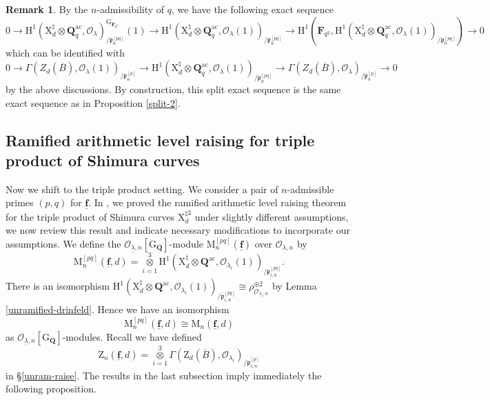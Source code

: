 \documentclass[10pt]{amsart}
\numberwithin{equation}{section}
\theoremstyle{plain}
\numberwithin{equation}{section}
\theoremstyle{definition}
\newtheorem{remark}[equation]{Remark}
\theoremstyle{remark}
\def\ac{\mathrm{ac}}
\def\ac{\mathrm{ac}}
\def\undlamb{\underline{\lambda}}
\def\triplef{\underline{\mathbf{f}}}
\def\threetensor{\overset{3}{\underset{i=1}\otimes}}
\def\calO{\mathcal{O}}
\def\frakp{\mathfrak{p}}
\def\FF{\mathbf{F}}
\def\QQ{\mathbf{Q}}
\def\rmG{\mathrm{G}}
\def\rmH{\mathrm{H}}
\def\rmM{\mathrm{M}}
\def\rmX{\mathrm{X}}
\def\rmZ{\mathrm{Z}}
\begin{document}
\begin{remark}
By the $n$-admissibility of $q$, we have the following exact sequence
\begin{equation*}
0\rightarrow  \rmH^{1}(\rmX^{\natural}_{d}\otimes{\QQ^{\ac}_{q}}, \calO_{\lambda})^{\rmG_{\FF_{q^{2}}}}_{/\frakp^{[pq]}_{n}}(1)\rightarrow  \rmH^{1}(\rmX^{\natural}_{d}\otimes{\QQ^{\ac}_{q}}, \calO_{\lambda}(1))_{/\frakp^{[pq]}_{n}}\rightarrow \rmH^{1}(\FF_{q^{2}}, \rmH^{1}(\rmX^{\natural}_{d}\otimes{\QQ^{\ac}_{q}}, \calO_{\lambda}(1))_{/\frakp^{[pq]}_{n}})\rightarrow 0
\end{equation*}
which can be identified with
\begin{equation*}
0\rightarrow \Gamma(Z_{d}(\overline{B}), \calO_{\lambda}(1))_{/\frakp_{n}^{[p]}}\rightarrow \rmH^{1}(\rmX^{\natural}_{d}\otimes{\QQ^{\ac}_{q}}, \calO_{\lambda}(1))_{/\frakp^{[pq]}_{n}}\rightarrow \Gamma(Z_{d}(\overline{B}), \calO_{\lambda})_{/\frakp^{[p]}_{n}}\rightarrow 0
\end{equation*}
by the above discussions. By construction, this split exact sequence is the same exact sequence as in Proposition \ref{split-2}.
\end{remark}

\subsection{Ramified arithmetic level raising for triple product of Shimura curves}
Now we shift to the triple product setting. We consider a pair of $n$-admissible primes $(p, q)$ for $\triplef$.  In \cite[Theorem 2]{Wang}, we proved the ramified arithmetic level raising theorem for the triple product of Shimura curves $\rmX^{\natural 3}_{d}$ under slightly different assumptions, we now review this result and indicate necessary modifications to incorporate our assumptions. We define the $\calO_{\undlamb, n}[\rmG_{\QQ}]$-module  $\rmM^{[{pq}]}_{n}(\triplef)$ over $\calO_{\underline{\lambda}, n}$ by 
\begin{equation*}
\rmM^{[{pq}]}_{n}(\triplef, d)=\threetensor\rmH^{1}(\rmX^{\natural}_{d}\otimes{\QQ^{\ac}}, \calO_{\lambda_{i}}(1))_{/\frakp^{[pq]}_{i,n}}.
\end{equation*} 
There is an isomorphism $\rmH^{1}(\rmX^{\natural}_{d}\otimes{\QQ^{\ac}}, \calO_{\lambda_{i}}(1))_{/\frakp^{[pq]}_{i,n}}\cong \rho^{\oplus2}_{\calO_{\lambda_{i}, n}}$ by Lemma \ref{unramified-drinfeld}. Hence we have an isomorphism 
\begin{equation*}
\rmM^{[{pq}]}_{n}(\triplef, d)\cong \rmM_{n}(\triplef, d) 
\end{equation*}
as $\calO_{\underline{\lambda}, n}[\rmG_{\QQ}]$-modules. 
Recall we have defined 
\begin{equation*}
\rmZ_{n}(\triplef, d)= \threetensor\Gamma(\rmZ_{d}(\overline{B}),\calO_{\lambda_{i}})_{/\frakp^{[p]}_{i,n}} 
\end{equation*}
in \S\ref{unram-raise}. The results in the last subsection imply immediately the following proposition.
\end{document}
